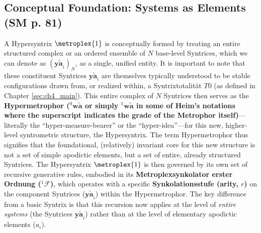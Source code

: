 \documentclass[
    12pt,              %
    a4paper,           %
    headings=normal,   %
    twoside=true,      %
    BCOR=8mm,          %
]{scrbook}
\newcommand{\q}[1]{\enquote{#1}}
\newcommand{\syntrix}{\bm{y\widetilde{a}}}
\newcommand{\syntrixtotalitaet}{T0}
\newcommand{\hypersyntrix}{\metroplex{1}}
\newcommand{\hypermetrophor}[1]{{}^{#1}\mathbf{w\widetilde{a}}}
\newcommand{\metroplexsynkolator}[1]{{}^{#1}\mathcal{F}}
\begin{document}
\subsection{Conceptual Foundation: Systems as Elements (SM p. 81)}
\label{sec:ch5_hypersyntrix_conceptual}
A Hypersyntrix \(\hypersyntrix\) is conceptually formed by treating an entire structured complex or an ordered ensemble of \(N\) base-level Syntrices, which we can denote as \((\syntrix_i)_N\), as a single, unified entity. It is important to note that these constituent Syntrices \(\syntrix_i\) are themselves typically understood to be stable configurations drawn from, or realized within, a Syntrixtotalität \(\syntrixtotalitaet\) (as defined in Chapter \ref{sec:ch4_main}). This entire complex of \(N\) Syntrices then serves as the \textbf{Hypermetrophor (\(\hypermetrophor{0}\) or simply \(\hypermetrophor{1}\) in some of Heim's notations where the superscript indicates the grade of the Metrophor itself)}—literally the \q{hyper-measure-bearer} or the \q{hyper-idea}—for this new, higher-level syntrometric structure, the Hypersyntrix. The term Hypermetrophor thus signifies that the foundational, (relatively) invariant core for this new structure is not a set of simple apodictic elements, but a set of entire, already structured Syntrices. The Hypersyntrix \(\hypersyntrix\) is then governed by its own set of recursive generative rules, embodied in its \textbf{Metroplexsynkolator erster Ordnung (\(\metroplexsynkolator{1}\))}, which operates with a specific \textbf{Synkolationsstufe (arity, \(r\))} on the component Syntrices (\(\syntrix_i\)) within the Hypermetrophor. The key difference from a basic Syntrix is that this recursion now applies at the level of \textit{entire systems} (the Syntrices \(\syntrix_i\)) rather than at the level of elementary apodictic elements (\(a_i\)).
\end{document}
